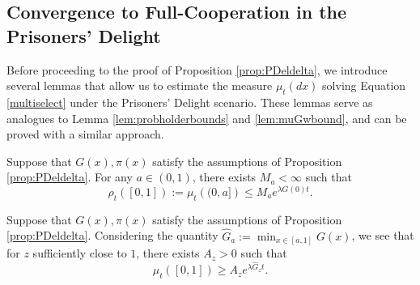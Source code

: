 \documentclass[11pt]{article}
\numberwithin{equation}{section}
\begin{document}
{ 

 \subsection{Convergence to Full-Cooperation in the Prisoners' Delight}
\label{sec:PDel}

Before proceeding to the proof of Proposition \ref{prop:PDeldelta}, we introduce several lemmas that allow us to estimate the measure $\mu_t(dx)$ solving Equation \eqref{multiselect} under the Prisoners' Delight scenario. These lemmas serve as analogues to Lemma \ref{lem:probholderbounds} and \ref{lem:muGwbound}, and can be proved with a similar approach.

\begin{lemma} \label{lem:PDelintervalbound}
Suppose that $G(x), \pi(x)$ satisfy the assumptions of Proposition \ref{prop:PDeldelta}. For any $a \in (0,1)$, there exists $M_a < \infty$ such that 
\begin{equation} \label{eq:Pdelintervalbound}
   \rho_t\left([0,1]\right) := \mu_t\left((0,a]\right) \leq M_a e^{\lambda G(0) t}. 
\end{equation}
\end{lemma}


\begin{lemma} \label{lem:muGzbound}
Suppose that $G(x), \pi(x)$ satisfy the assumptions of Proposition \ref{prop:PDeldelta}. Considering the quantity $\hat{G}_{a} := \min_{x \in [a,1]} G(x)$, we see that for $z$ sufficiently close to $1$, there exists $A_z > 0$ such that
\begin{equation} \label{eq:muGzbound}
 \mu_t\left([0,1]\right) \geq A_z e^{\lambda \hat{G}_z t}.    
\end{equation}
\end{lemma}

}
\end{document}
